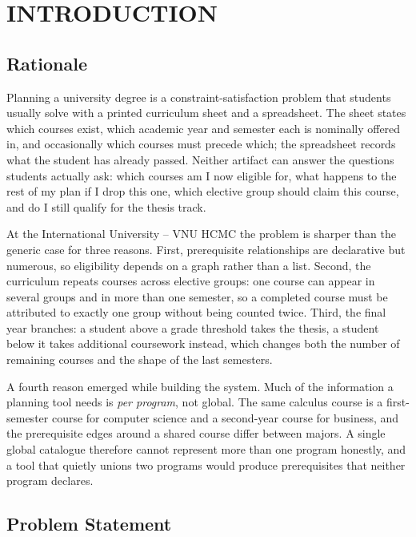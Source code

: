 \chapter{INTRODUCTION}

\label{ch:introduction}

\section{Rationale}

Planning a university degree is a constraint-satisfaction problem that students usually solve
with a printed curriculum sheet and a spreadsheet. The sheet states which courses exist, which
academic year and semester each is nominally offered in, and occasionally which courses must
precede which; the spreadsheet records what the student has already passed. Neither artifact can
answer the questions students actually ask: which courses am I now eligible for, what happens to
the rest of my plan if I drop this one, which elective group should claim this course, and do I
still qualify for the thesis track.

At the International University -- VNU HCMC the problem is sharper than the generic case for three
reasons. First, prerequisite relationships are declarative but numerous, so eligibility depends on
a graph rather than a list. Second, the curriculum repeats courses across elective groups: one
course can appear in several groups and in more than one semester, so a completed course must be
attributed to exactly one group without being counted twice. Third, the final year branches: a
student above a grade threshold takes the thesis, a student below it takes additional coursework
instead, which changes both the number of remaining courses and the shape of the last semesters.

A fourth reason emerged while building the system. Much of the information a planning tool needs is
\emph{per program}, not global. The same calculus course is a first-semester course for computer
science and a second-year course for business, and the prerequisite edges around a shared course
differ between majors. A single global catalogue therefore cannot represent more than one program
honestly, and a tool that quietly unions two programs would produce prerequisites that neither
program declares.

\section{Problem Statement}

